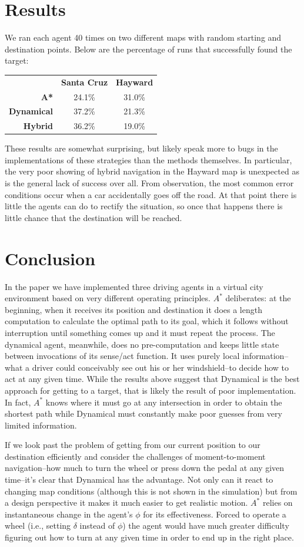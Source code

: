 \documentclass{article}
\begin{document}
\section{Results}
We ran each agent 40 times on two different maps with random starting
and destination points. Below are the percentage of runs that
successfully found the target:

\begin{tabular}[c]{rcc}
  & \textbf{Santa Cruz} & \textbf{Hayward} \\
\textbf{A*} & 24.1\% & 31.0\% \\
\textbf{Dynamical} & 37.2\% & 21.3\% \\
\textbf{Hybrid} & 36.2\% & 19.0\%
\end{tabular}

These results are somewhat surprising, but likely speak more to bugs
in the implementations of these strategies than the methods
themselves. In particular, the very poor showing of hybrid navigation
in the Hayward map is unexpected as is the general lack of success
over all. From observation, the most common error conditions occur
when a car accidentally goes off the road. At that point there is
little the agents can do to rectify the situation, so once that
happens there is little chance that the destination will be reached.

\section{Conclusion}
In the paper we have implemented three driving agents in a virtual
city environment based on very different operating principles. $A^*$
deliberates: at the beginning, when it receives its position and
destination it does a length computation to calculate the optimal path
to its goal, which it follows without interruption until something
comes up and it must repeat the process. The dynamical agent,
meanwhile, does no pre-computation and keeps little state between
invocations of its sense/act function. It uses purely local
information--what a driver could conceivably see out his or her
windshield--to decide how to act at any given time. While the results
above suggest that Dynamical is the best approach for getting to a
target, that is likely the result of poor implementation. In fact, $A^*$
knows where it must go at any intersection in order to obtain the
shortest path while Dynamical must constantly make poor guesses from
very limited information.

If we look past the problem of getting from our current position to
our destination efficiently and consider the challenges of
moment-to-moment navigation--how much to turn the wheel or press down
the pedal at any given time--it's clear that Dynamical has the
advantage. Not only can it react to changing map conditions (although
this is not shown in the simulation) but from a design perspective it
makes it much easier to get realistic motion. $A^*$ relies on
instantaneous change in the agent's $\phi$ for its
effectiveness. Forced to operate a wheel (i.e., setting $\delta$
instead of $\phi$) the agent would have much greater difficulty
figuring out how to turn at any given time in order to end up in the
right place. 


{}

\end{document}
